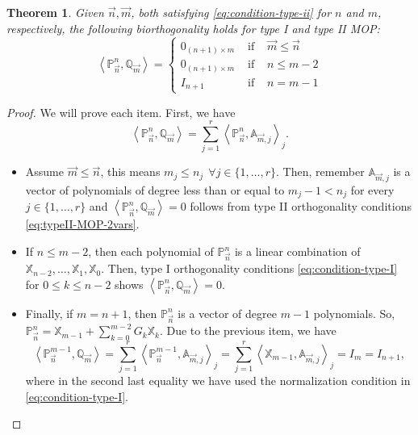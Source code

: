 \documentclass[12pt,a4]{article}
\theoremstyle{plain}
\newtheorem{theorem}{Theorem}[section]
\newcommand{\prodesc}[2]{\left\langle #1 , #2 \right\rangle}
\begin{document}
\begin{theorem}
    \label{th:biorthogonality}
    Given $\vec n, \vec m$, both satisfying \eqref{eq:condition-type-ii} for $n$ and $m$, respectively, the following biorthogonality holds for type I and type II MOP:
    \begin{equation}
        \prodesc{\mathbb P_{\vec n}^n}{\mathbb Q_{\vec m}} = \left\{\begin{array}{ccl}
            0_{(n+1)\times m} &   \text{ if } & \vec m \leq \vec n \\
            0_{(n+1)\times m} &   \text{ if } &  n \leq m -2 \\
            I_{n+1} & \text{ if } & n=m-1 
        \end{array}\right.   
    \end{equation}
\end{theorem}
\begin{proof}
    We will prove each item. First, we have
    \begin{equation*}
        \prodesc{\mathbb P_{\vec n}^n}{\mathbb Q_{\vec m}} = \sum_{j=1}^r \prodesc{\mathbb{P}_{\vec n}^n}{\mathbb A_{\vec m, j}}_j.
    \end{equation*}
    \begin{itemize}
        \item Assume $\vec m \leq \vec n$, this means $m_j \leq n_j \ \ \forall j\in\{1,\dots,r\}$. Then, remember $\mathbb{A}_{\vec m,j}$ is a vector of polynomials of degree less than or equal to $m_j-1 < n_j$ for every $j\in\{1,\dots,r\}$ and $\prodesc{\mathbb P_{\vec n}^n}{\mathbb Q_{\vec m}} =0$ follows from type II orthogonality conditions \eqref{eq:typeII-MOP-2vars}.
        \item  If $n\leq m-2$, then each polynomial of $\mathbb P_{\vec n}^n$ is a linear combination of $\mathbb X_{n-2},\dots,\mathbb X_1,\mathbb X_0$. Then, type I orthogonality conditions \eqref{eq:condition-type-I} for $0\leq k\leq n-2$ shows $\prodesc{\mathbb P_{\vec n}^n}{\mathbb Q_{\vec m}} =0$.
        \item Finally, if $m=n+1$, then $\mathbb P_{\vec n}^n$ is a vector of degree $m-1$ polynomials. So, $\mathbb P_{\vec n}^n = \mathbb X_{m-1} + \displaystyle\sum_{k=0}^{m-2} G_{k} \mathbb X_{k}$. Due to the previous item, we have
        $$
        \prodesc{\mathbb P_{\vec n}^{m-1}}{\mathbb Q_{\vec m}} = \sum_{j=1}^r \prodesc{\mathbb{P}_{\vec n}^{m-1}}{\mathbb A_{\vec m, j}}_j = \sum_{j=1}^r \prodesc{\mathbb X_{m-1}}{\mathbb A_{\vec m, j}}_j = I_m = I_{n+1},
        $$
        where in the second last equality we have used the normalization condition in \eqref{eq:condition-type-I}.
    \end{itemize}
\end{proof}
\end{document}
